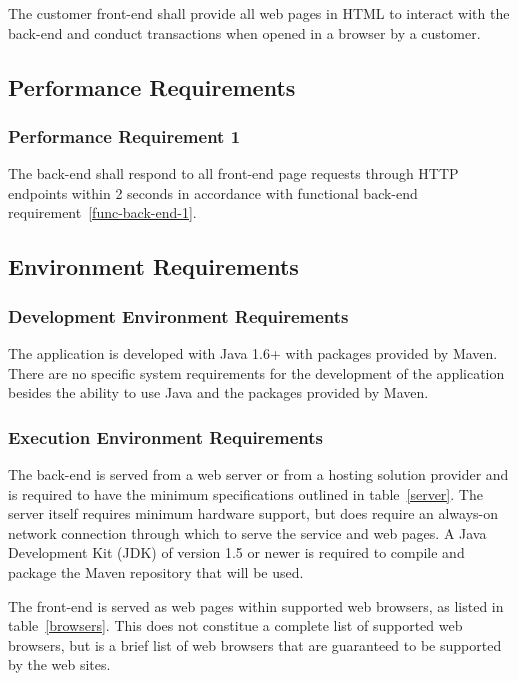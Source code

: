 \documentclass{article}
\begin{document}
The customer front-end shall provide all web pages in HTML to interact with the
back-end and conduct transactions when opened in a browser by a customer.

\subsection{Performance Requirements}

\subsubsection{Performance Requirement 1}
\label{perf-back-end-1}

The back-end shall respond to all front-end page requests through HTTP endpoints
within 2 seconds in accordance with functional back-end
requirement~\ref{func-back-end-1}.

\subsection{Environment Requirements}
\subsubsection{Development Environment Requirements}

The application is developed with Java 1.6+ with packages provided by
Maven.  There are no specific system requirements for the development of
the application besides the ability to use Java and the packages provided
by Maven.

\subsubsection{Execution Environment Requirements}

The back-end is served from a web server or from a hosting solution provider and is
required to have the minimum specifications outlined in table~\ref{server}.  The
server itself requires minimum hardware support, but does require an always-on
network connection through which to serve the service and web pages.  A Java
Development Kit (JDK) of version 1.5 or newer is required to compile and package
the Maven repository that will be used.

The front-end is served as web pages within supported web browsers, as listed in
table~\ref{browsers}.  This does not constitue a complete list of supported web
browsers, but is a brief list of web browsers that are guaranteed to be supported
by the web sites.
\end{document}
